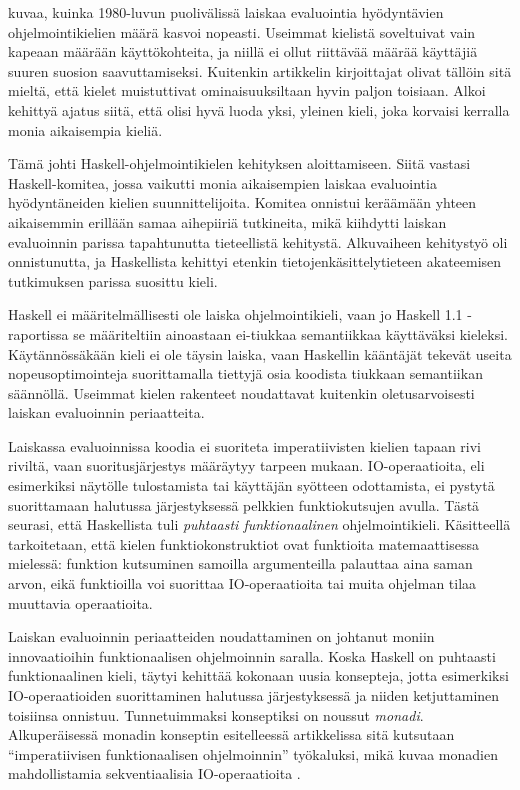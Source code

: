 \citet{hudak2007history} kuvaa, kuinka 1980-luvun puolivälissä laiskaa evaluointia hyödyntävien ohjelmointikielien määrä kasvoi nopeasti. Useimmat kielistä soveltuivat vain kapeaan määrään käyttökohteita, ja niillä ei ollut riittävää määrää käyttäjiä suuren suosion saavuttamiseksi. Kuitenkin artikkelin kirjoittajat olivat tällöin sitä mieltä, että kielet muistuttivat ominaisuuksiltaan hyvin paljon toisiaan. Alkoi kehittyä ajatus siitä, että olisi hyvä luoda yksi, yleinen kieli, joka korvaisi kerralla monia aikaisempia kieliä.

Tämä johti Haskell-ohjelmointikielen kehityksen aloittamiseen. Siitä vastasi Haskell-komitea, jossa vaikutti monia aikaisempien laiskaa evaluointia hyödyntäneiden kielien suunnittelijoita. Komitea onnistui keräämään yhteen aikaisemmin erillään samaa aihepiiriä tutkineita, mikä kiihdytti laiskan evaluoinnin parissa tapahtunutta tieteellistä kehitystä. Alkuvaiheen kehitystyö oli onnistunutta, ja Haskellista kehittyi etenkin tietojenkäsittelytieteen akateemisen tutkimuksen parissa suosittu kieli.

Haskell ei määritelmällisesti ole laiska ohjelmointikieli, vaan jo Haskell 1.1 -raportissa \citep{yale1991report} se määriteltiin ainoastaan ei-tiukkaa semantiikkaa käyttäväksi kieleksi. Käytännössäkään kieli ei ole täysin laiska, vaan Haskellin kääntäjät tekevät useita nopeusoptimointeja suorittamalla tiettyjä osia koodista tiukkaan semantiikan säännöllä. Useimmat kielen rakenteet noudattavat kuitenkin oletusarvoisesti laiskan evaluoinnin periaatteita.

Laiskassa evaluoinnissa koodia ei suoriteta imperatiivisten kielien tapaan rivi riviltä, vaan suoritusjärjestys määräytyy tarpeen mukaan. IO-operaatioita, eli esimerkiksi näytölle tulostamista tai käyttäjän syötteen odottamista, ei pystytä suorittamaan halutussa järjestyksessä pelkkien funktiokutsujen avulla. Tästä seurasi, että Haskellista tuli \textit{puhtaasti funktionaalinen} ohjelmointikieli. Käsitteellä tarkoitetaan, että kielen funktiokonstruktiot ovat funktioita matemaattisessa mielessä: funktion kutsuminen samoilla argumenteilla palauttaa aina saman arvon, eikä funktioilla voi suorittaa IO-operaatioita tai muita ohjelman tilaa muuttavia operaatioita.

Laiskan evaluoinnin periaatteiden noudattaminen on johtanut moniin innovaatioihin funktionaalisen ohjelmoinnin saralla. Koska Haskell on puhtaasti funktionaalinen kieli, täytyi kehittää kokonaan uusia konsepteja, jotta esimerkiksi IO-operaatioiden suorittaminen halutussa järjestyksessä ja niiden ketjuttaminen toisiinsa onnistuu. Tunnetuimmaksi konseptiksi on noussut \textit{monadi}. Alkuperäisessä monadin konseptin esitelleessä artikkelissa sitä kutsutaan ``imperatiivisen funktionaalisen ohjelmoinnin'' työkaluksi, mikä kuvaa monadien mahdollistamia sekventiaalisia IO-operaatioita \citep{PeytonJones199371}.


